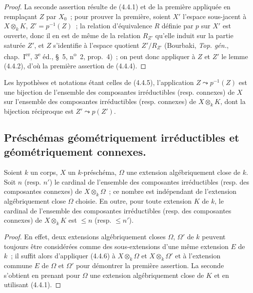 \begin{proof}
La seconde assertion résulte de (4.4.1) et de la première appliquée en
remplaçant $Z$ par $X_0$~; pour prouver la première, soient $X'$ l'espace
sous-jacent à $X\otimes_k K$, $Z'=p^{-1}(Z)$~; la
relation d'équivalence $R$ définie par $p$ sur $X'$ est ouverte, donc il en est
de même de la relation $R_{Z'}$ qu'elle induit sur la partie saturée $Z'$, et
$Z$ s'identifie à l'espace quotient $Z'/R_{Z'}$ (Bourbaki,
\emph{Top. gén.}, chap.~I\textsuperscript{er}, 3\textsuperscript{e} éd.,
\S~5, n\textsuperscript{o}~2, prop.~4)~; on peut donc appliquer à $Z$ et $Z'$
le lemme (4.4.2), d'où la première assertion de (4.4.4).
\end{proof}

\begin{corollary}[4.4.6]
\label{IV.2.4.4.6-fr}
Les hypothèses et notations étant celles de \textup{(4.4.5)}, l'application
$Z\leadsto p^{-1}(Z)$ est une bijection de l'ensemble des composantes
irréductibles \textup{(resp.} connexes\textup{)} de $X$ sur l'ensemble des composantes
irréductibles \textup{(resp.} connexes\textup{)} de $X\otimes_k K$, dont la bijection réciproque
est $Z'\leadsto p(Z')$.
\end{corollary}

\subsection{Préschémas géométriquement irréductibles et géométriquement
connexes.}
\label{subsection:IV.2.4.5-fr}

\begin{proposition}[4.5.1]
\label{IV.2.4.5.1-fr}
Soient $k$ un corps, $X$ un $k$-préschéma, $\Omega$ une extension
algébriquement close de $k$. Soit $n$ \textup{(resp.} $n'$\textup{)} le cardinal de l'ensemble
des composantes irréductibles \textup{(resp.} des composantes connexes\textup{)} de
$X\otimes_k\Omega$~; ce nombre est indépendant de l'extension algébriquement
close $\Omega$ choisie. En outre, pour toute extension $K$ de $k$, le cardinal
de l'ensemble des composantes irréductibles \textup{(resp.} des composantes connexes\textup{)}
de $X\otimes_k K$ est $\leqslant n$ \textup{(resp.} $\leqslant n'$\textup{)}.
\end{proposition}

\begin{proof}
En effet, deux extensions algébriquement closes $\Omega$, $\Omega'$ de $k$
peuvent toujours être considérées comme des sous-extensions d'une même
extension $E$ de $k$~; il suffit alors d'appliquer (4.4.6) à
$X\otimes_k\Omega$ et $X\otimes_k\Omega'$ et à l'extension commune $E$ de
$\Omega$ et $\Omega'$ pour démontrer la première assertion. La seconde
s'obtient en prenant pour $\Omega$ une extension algébriquement close de $K$
et en utilisant (4.4.1).
\end{proof}

